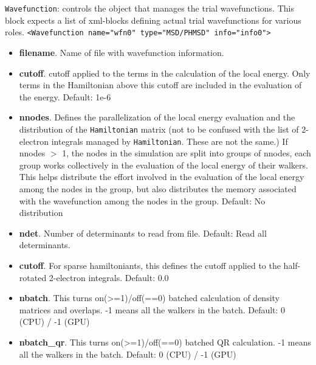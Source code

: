 \texttt{Wavefunction}: controls the object that manages the trial wavefunctions. This block expects a list of xml-blocks defining actual trial wavefunctions for various roles. 
\texttt{<Wavefunction name="wfn0" type="MSD/PHMSD" info="info0">}
\begin{itemize}
\item \textbf{filename}. Name of file with wavefunction information.
\item \textbf{cutoff}. cutoff applied to the terms in the calculation of the local energy. Only terms in the Hamiltonian above this cutoff are included in the evaluation of the energy.
      Default: 1e-6
\item \textbf{nnodes}. Defines the parallelization of the local energy evaluation and the distribution of the \texttt{Hamiltonian} matrix (not to be confused with the list of 2-electron integrals managed by \texttt{Hamiltonian}. These are not the same.) If nnodes $>$ 1, the nodes in the simulation are split into groups of nnodes, each group works collectively in the evaluation of the local energy of their walkers. This helps distribute the effort involved in the evaluation of the local energy among the nodes in the group, but also distributes the memory associated with the wavefunction among the nodes in the group.
      Default: No distribution
\item \textbf{ndet}. Number of determinants to read from file.
      Default: Read all determinants. 
\item \textbf{cutoff}. For sparse hamiltoniants, this defines the cutoff applied to the half-rotated 2-electron integrals. 
      Default: 0.0
\item \textbf{nbatch}. This turns on(>=1)/off(==0) batched calculation of density matrices and overlaps. -1 means all the walkers in the batch. 
      Default: 0 (CPU) / -1 (GPU) 
\item \textbf{nbatch\_qr}. This turns on(>=1)/off(==0) batched QR calculation. -1 means all the walkers in the batch.
      Default: 0 (CPU) / -1 (GPU) 
\end{itemize}

